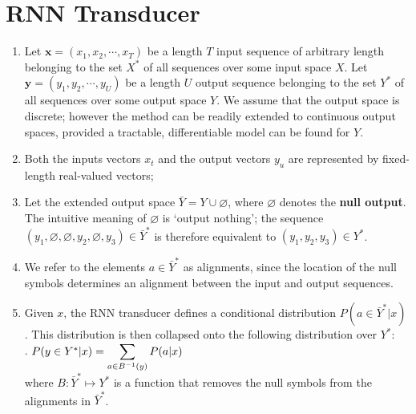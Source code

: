 \section{RNN Transducer}

\begin{enumerate}
    \item Let $\bm{x} = (x_1, x_2, \cdots , x_T )$ be a length $T$ input sequence of arbitrary length belonging to the set $X ^\ast$ of all sequences over some input space $X $.
    Let $\bm{y} = (y_1, y_2, \cdots , y_U )$ be a length $U$ output sequence belonging to the set $Y^\ast$ of all sequences over some output space $Y$. 
    We assume that the output space is discrete; however the method can be readily extended to continuous output spaces, provided a tractable, differentiable model can be found for $Y$.
    \hfill \cite{arxiv/1211.3711/Sequence-Transduction-RNN}

    \item Both the inputs vectors $x_t$ and the output vectors $y_u$ are represented by fixed-length real-valued vectors; 
    \hfill \cite{arxiv/1211.3711/Sequence-Transduction-RNN}

    \item Let the extended output space $\bar{Y} = Y \cup \varnothing$, where $\varnothing$ denotes the \textbf{null output}. 
    The intuitive meaning of $\varnothing$ is ‘output nothing’; the sequence $(y_1, \varnothing, \varnothing, y_2, \varnothing, y_3) \in \bar{Y}^\ast$ is therefore equivalent to $(y_1, y_2, y_3) \in Y^\ast$.
    \hfill \cite{arxiv/1211.3711/Sequence-Transduction-RNN}

    \item We refer to the elements $a \in \bar{Y}^\ast$ as alignments, since the location of the null symbols determines an alignment between the input and output sequences. 
    \hfill \cite{arxiv/1211.3711/Sequence-Transduction-RNN}

    \item Given $x$, the RNN transducer defines a conditional distribution $P(a \in \bar{Y}^\ast|x)$.
    This distribution is then collapsed onto the following distribution over ${Y}^\ast$:
    \hfill \cite{arxiv/1211.3711/Sequence-Transduction-RNN}
    \\[0.2cm]
    .\hfill
    $
        P(y\in Y^\ast|x) = \displaystyle\sum_{a \in B^{-1}(y)} P(a|x)
    $
    \hfill \cite{arxiv/1211.3711/Sequence-Transduction-RNN}
    \\[0.2cm]
    where $B : \bar{Y}^\ast \mapsto Y^\ast$ is a function that removes the null symbols from the alignments in $\bar{Y}^\ast$.
    \hfill \cite{arxiv/1211.3711/Sequence-Transduction-RNN}


\end{enumerate}
